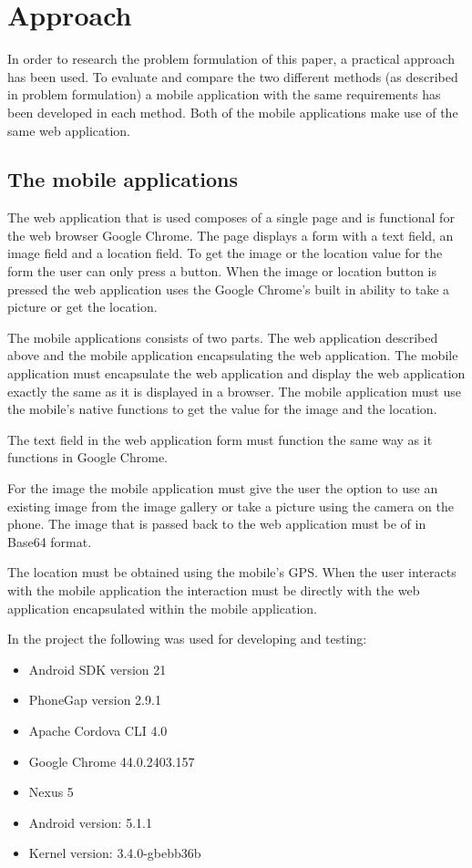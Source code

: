 
\chapter{Approach}
In order to research the problem formulation of this paper, a practical approach has been used. To evaluate and compare the two different methods (as described in problem formulation) a mobile application with the same requirements has been developed in each method. Both of the mobile applications make use of the same web application. 

\section{The mobile applications}
The web application that is used composes of a single page and is functional for the web browser Google Chrome. The page displays a form with a text field, an image field and a location field. To get the image or the location value for the form the user can only press a button. When the image or location button is pressed the web application uses the Google Chrome’s built in ability to take a picture or get the location.

The mobile applications consists of two parts. The web application described above and the mobile application encapsulating the web application. The mobile application must encapsulate the web application and display the web application exactly the same as it is displayed in a browser. The mobile application must use the mobile’s native functions to get the value for the image and the location.

The text field  in the web application form must function the same way as it functions in Google Chrome. 

For the image the mobile application must give the user the option to use an existing image from the image gallery or take a picture using the camera on the phone. The image that is passed back to the web application must be of in Base64 format. 

The location must be obtained using the mobile’s GPS. When the user interacts with the mobile application the interaction must be directly with the web application encapsulated within the mobile application. 

In the project the following was used for developing and testing:
\begin{itemize}
\item Android SDK version 21
\item PhoneGap version 2.9.1
\item Apache Cordova CLI 4.0
\item Google Chrome 44.0.2403.157
\item Nexus 5
\item Android version: 5.1.1
\item Kernel version: 3.4.0-gbebb36b
\end{itemize}
